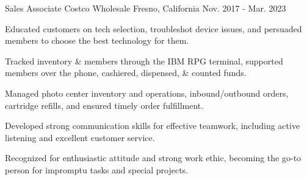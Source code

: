 \begin{cventries}
  \cventry
    {Sales Associate} %
    {Costco Wholesale} %
    {Fresno, California} %
    {Nov. 2017 - Mar. 2023} %
    {
      \begin{cvitems} %
	  \item {Educated customers on tech selection, troubleshot device issues, and persuaded members to choose the best technology for them.}
	  \item {Tracked inventory \& members through the IBM RPG terminal, supported members over the phone, cashiered, dispensed, \& counted funds.}
	  \item {Managed photo center inventory and operations, inbound/outbound orders, cartridge refills, and ensured timely order fulfillment.}
	  \item {Developed strong communication skills for effective teamwork, including active listening and excellent customer service.}
	  \item {Recognized for enthusiastic attitude and strong work ethic, becoming the go-to person for impromptu tasks and special projects.} 
	  \end{cvitems}
	 }

\end{cventries}
